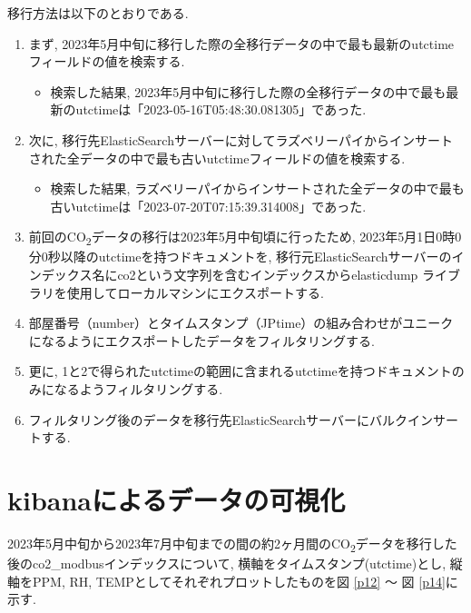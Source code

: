 移行方法は以下のとおりである.

\begin{enumerate}
    \item まず, 2023年5月中旬に移行した際の全移行データの中で最も最新のutctimeフィールドの値を検索する.
          \begin{itemize}
              \item 検索した結果, 2023年5月中旬に移行した際の全移行データの中で最も最新のutctimeは「2023-05-16T05:48:30.081305」であった.
          \end{itemize}
    \item 次に, 移行先ElasticSearchサーバーに対してラズベリーパイからインサートされた全データの中で最も古いutctimeフィールドの値を検索する.
          \begin{itemize}
              \item 検索した結果, ラズベリーパイからインサートされた全データの中で最も古いutctimeは「2023-07-20T07:15:39.314008」であった.
          \end{itemize}
    \item 前回のCO\textsubscript{2}データの移行は2023年5月中旬頃に行ったため, 2023年5月1日0時0分0秒以降のutctimeを持つドキュメントを, 移行元ElasticSearchサーバーのインデックス名にco2という文字列を含むインデックスからelasticdump \cite{1}ライブラリを使用してローカルマシンにエクスポートする.
    \item 部屋番号（number）とタイムスタンプ（JPtime）の組み合わせがユニークになるようにエクスポートしたデータをフィルタリングする.
    \item 更に, 1と2で得られたutctimeの範囲に含まれるutctimeを持つドキュメントのみになるようフィルタリングする.
    \item フィルタリング後のデータを移行先ElasticSearchサーバーにバルクインサートする.
\end{enumerate}

\section{kibanaによるデータの可視化}

2023年5月中旬から2023年7月中旬までの間の約2ヶ月間のCO\textsubscript{2}データを移行した後のco2\_modbusインデックスについて, 横軸をタイムスタンプ(utctime)とし, 縦軸をPPM, RH, TEMPとしてそれぞれプロットしたものを図 \ref{p12} 〜 図 \ref{p14}に示す.

